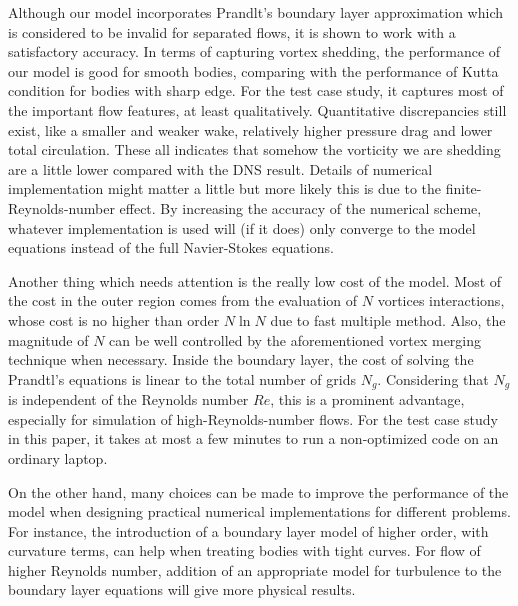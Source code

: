
Although our model incorporates Prandlt's boundary layer approximation which is considered to be invalid for separated flows, it is shown to work with a satisfactory accuracy.
In terms of capturing vortex shedding, the performance of our model is good for smooth bodies, comparing with the performance of Kutta condition for bodies with sharp edge.
For the test case study, it captures most of the important flow features, at least qualitatively.
Quantitative discrepancies still exist, like a smaller and weaker wake, relatively higher pressure drag and lower total circulation.
These all indicates that somehow the vorticity we are shedding are a little lower compared with the DNS result.
Details of numerical implementation might matter a little but more likely this is due to the finite-Reynolds-number effect.
By increasing the accuracy of the numerical scheme, whatever implementation is used will (if it does) only converge to the model equations instead of the full Navier-Stokes equations.

Another thing which needs attention is the really low cost of the model.
Most of the cost in the outer region comes from the evaluation of $N$ vortices interactions, whose cost is no higher than order $N\ln N$ due to fast multiple method. 
Also, the magnitude of $N$ can be well controlled by the aforementioned vortex merging technique when necessary.
Inside the boundary layer, the cost of solving the Prandtl's equations is linear to the total number of grids $N_g$.
Considering that $N_g$ is independent of the Reynolds number $Re$, this is a prominent advantage, especially for simulation of high-Reynolds-number flows.
For the test case study in this paper, it takes at most a few minutes to run a non-optimized code on an ordinary laptop.

On the other hand, many choices can be made to improve the performance of the model when designing practical numerical implementations for different problems.
For instance, the introduction of a boundary layer model of higher order, with curvature terms, can help when treating bodies with tight curves. For flow of higher Reynolds number, addition of an appropriate model for turbulence to the boundary layer equations will give more physical results.